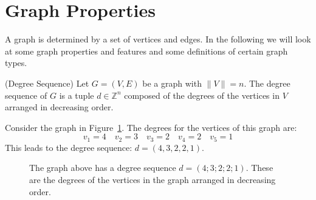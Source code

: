 \section{Graph Properties}


A graph is determined by a set of vertices and edges. In the following we will look at some graph properties and features and some definitions of certain graph types. 



%
%
\begin{definition}{(Degree Sequence)}
Let \(G = (V,E)\) be a graph with \(\|V\| = n\).
The degree sequence of \(G\) is a tuple \(d\in \mathbb{Z}^n\) composed of the degrees of the vertices in \(V\) arranged in decreasing order.
\end{definition}
%
\begin{example}
Consider the graph in Figure~\ref{fig:g3}.
The degrees for the vertices of this graph are:
\[v_1 = 4 \quad v_2 = 3 \quad v_3 = 2 \quad v_4 = 2 \quad v_5 = 1\]
This leads to the degree sequence: \(d = (4, 3, 2, 2, 1)\).
\end{example}
%
\begin{figure}
\centering

\caption{\label{fig:g3}%
The graph above has a degree sequence \(d = (4; 3; 2; 2; 1)\).
These are the degrees of the vertices in the graph arranged in decreasing order.
}
\end{figure}
%


